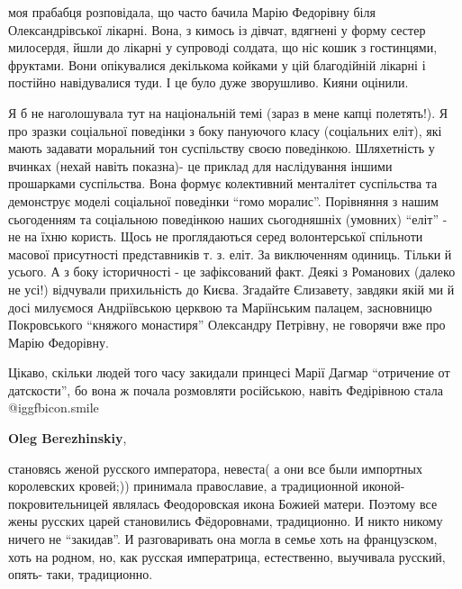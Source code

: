 \begin{itemize}
\begin{itemize}
\end{itemize} %


моя прабабця розповідала, що часто бачила Марію Федорівну біля Олександрівської
лікарні. Вона, з кимось із дівчат, вдягнені у форму сестер милосердя, йшли до
лікарні у супроводі солдата, що ніс кошик з гостинцями, фруктами. Вони
опікувалися декількома койками у цій благодійній лікарні і постійно
навідувалися туди. І це було дуже зворушливо. Кияни оцінили.

\begin{itemize} %

Я б не наголошувала тут на національній темі (зараз в мене капці полетять!). Я
про зразки соціальної поведінки з боку пануючого класу (соціальних еліт), які
мають задавати моральний тон суспільству своєю поведінкою. Шляхетність у
вчинках (нехай навіть показна)- це приклад для наслідування іншими прошарками
суспільства. Вона формує колективний менталітет суспільства та демонструє
моделі соціальної поведінки \enquote{гомо моралис}. Порівняння з нашим сьогоденням та
соціальною поведінкою наших сьогодняшніх (умовних) \enquote{еліт} - не на їхню користь.
Щось не проглядаються серед волонтерської спільноти масової присутності
представників т. з. еліт. За виключенням одиниць. Тільки й усього. А з боку
історичності - це зафіксований факт. Деякі з Романових (далеко не усі!)
відчували прихильність до Києва. Згадайте Єлизавету, завдяки якій ми й досі
милуємося Андріївською церквою та Маріїнським палацем, засновницю Покровського
\enquote{княжого монастиря} Олександру Петрівну, не говорячи вже про Марію Федорівну.

\end{itemize} %


Цікаво, скільки людей того часу закидали принцесі Марії Дагмар \enquote{отричение от
датскости}, бо вона ж почала розмовляти російською, навіть Федірівною стала  @igg{fbicon.smile} 

\begin{itemize} %
\textbf{Oleg Berezhinskiy},

становясь женой русского императора, невеста( а они все были импортных
королевских кровей;)) принимала православие, а традиционной иконой-
покровительницей являлась Феодоровская икона Божией матери. Поэтому все жены
русских царей становились Фёдоровнами, традиционно. И никто никому ничего не
\enquote{закидав}. И разговаривать она могла в семье хоть на французском, хоть
на родном, но, как русская императрица, естественно, выучивала русский, опять-
таки, традиционно.


\end{itemize}
\end{itemize}
